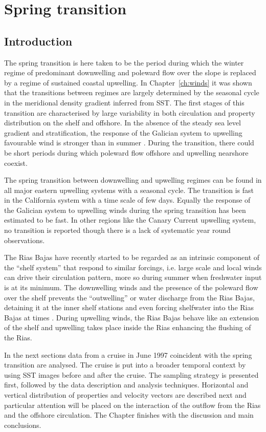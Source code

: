 %
\chapter{Spring transition}\label{ch:spring}
\section{Introduction}
The spring transition is here taken to be the period during which
the winter regime of predominant downwelling and poleward flow
over the slope is replaced by a regime of sustained coastal
upwelling. In Chapter~\ref{ch:winds} it was shown that the
transitions between regimes are largely determined by the seasonal
cycle in the meridional density gradient inferred from SST. The
first stages of this transition are characterised by large
variability in both circulation and property distribution on the
shelf and offshore. In the absence of the steady sea level
gradient and stratification, the response of the Galician system
to upwelling favourable wind is stronger than in summer
\citet{Castro00}. During the transition, there could be short
periods during which poleward flow offshore and upwelling
nearshore coexist.

The spring transition between downwelling and upwelling regimes
can be found in all major eastern upwelling systems with a
seasonal cycle. The transition is fast in the California system
\citep{Huyer83} with a time scale of few days. Equally the
response of the Galician system to upwelling winds during the
spring transition has been estimated to be fast. In other regions
like the Canary Current upwelling system, no transition is
reported though there is a lack of systematic year round
observations.

The Rias Bajas have recently started to be regarded as an
intrinsic component of the ``shelf system'' that respond to
similar forcings, i.e. large scale and local winds can drive their
circulation pattern, more so during summer when freshwater input
is at its minimum. The downwelling winds and the presence of the
poleward flow over the shelf prevents the ``outwelling'' or water
discharge from the Rias Bajas, detaining it at the inner shelf
stations \citep{Castro97} and even forcing shelfwater into the
Rias Bajas at times \citep[e.g.][]{Prego01,Sordo01}. During
upwelling winds, the Rias Bajas behave like an extension of the
shelf \citep{Doval98} and upwelling takes place inside the Rias
\citep{Alvarez-Salgado00} enhancing the flushing of the Rias.

In the next sections data from a cruise in June 1997 coincident
with the spring transition are analysed. The cruise is put into a
broader temporal context by using SST images before and after the
cruise. The sampling strategy is presented first, followed by the
data description and analysis techniques.  Horizontal and vertical
distribution of properties and velocity vectors are described next
and particular attention will be placed on the interaction of the
outflow from the Rias and the offshore circulation. The Chapter
finishes with the discussion and main conclusions.

